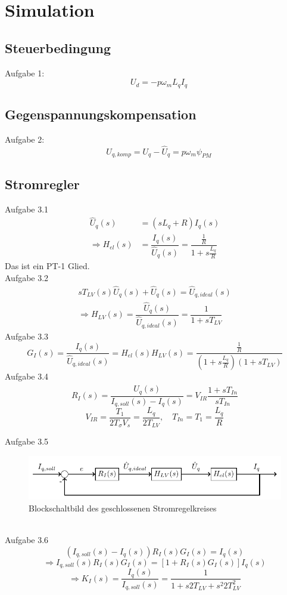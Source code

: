 \documentclass[AMdocument,optGerman]{AMlatex}%
\begin{document}
%
%
%  
%

\section{Simulation}
%
\subsection{Steuerbedingung}
%
Aufgabe 1: $$ \quad U_{d} = -p\omega_{m}L_{q}I_{q} $$
%
\subsection{Gegenspannungskompensation}
%
Aufgabe 2: $$ \quad U_{q,komp} = U_{q} - \hat{U}_{q} = p\omega_{m}\psi_{PM}  $$
%
\subsection{Stromregler}
%
Aufgabe 3.1 
\begin{align*}
\hat{U}_{q}(s) &= (sL_{q} + R)I_{q}(s) \\
\Rightarrow H_{el}(s) &= \dfrac{I_{q}(s)}{\hat{U}_{q}(s)} = \dfrac{\frac{1}{R}}{1+s\frac{L_{q}}{R}} 
\end{align*}
Das ist ein PT-1 Glied.\\

%
Aufgabe 3.2
\begin{align*}
sT_{LV}(s)\hat{U}_{q}(s) + \hat{U}_{q}(s) = \hat{U}_{q,ideal}(s) \\
\Rightarrow H_{LV}(s) = \dfrac{\hat{U}_{q}(s)}{\hat{U}_{q,ideal}(s)} = \dfrac{1}{1+sT_{LV}}
\end{align*}
%
Aufgabe 3.3
$$ G_{I}(s) = \dfrac{I_{q}(s)}{\hat{U}_{q,ideal}(s)} = H_{el}(s)H_{LV}(s) =  \dfrac{\frac{1}{R}}{(1+s\frac{L_{q}}{R})(1+sT_{LV})} $$
%
Aufgabe 3.4
$$ R_{I}(s) = \dfrac{\hat{U}_{q}(s)}{I_{q,soll}(s) - I_{q}(s)} = V_{IR}\dfrac{1+sT_{In}}{sT_{In}} $$
$$ V_{IR} = \dfrac{T_{1}}{2T_{\sigma}V_{s}} = \dfrac{L_{q}}{2T_{LV}}, \quad T_{In} = T_{1} = \dfrac{L_{q}}{R} $$
%

\clearpage

Aufgabe 3.5
\begin{figure}[htb]%
	\centering%
	\includegraphics[width=120mm]{Stromregler}\par%
	\caption{Blockschaltbild des geschlossenen Stromregelkreises}%
	\label{fig:MyImage}%
\end{figure}%
\\
%
Aufgabe 3.6
$$(I_{q,soll}(s) -I_{q}(s))R_{I}(s)G_{I}(s) = I_{q}(s)$$
$$\Rightarrow I_{q,soll}(s)R_{I}(s)G_{I}(s) = \left[ 1+R_{I}(s)G_{I}(s)\right]I_{q}(s)$$
$$\Rightarrow K_{I}(s) = \dfrac{I_{q}(s)}{I_{q,soll}(s)} = \dfrac{1}{1+s2T_{LV}+s^{2}2T_{LV}^{2}}$$
\end{document}
